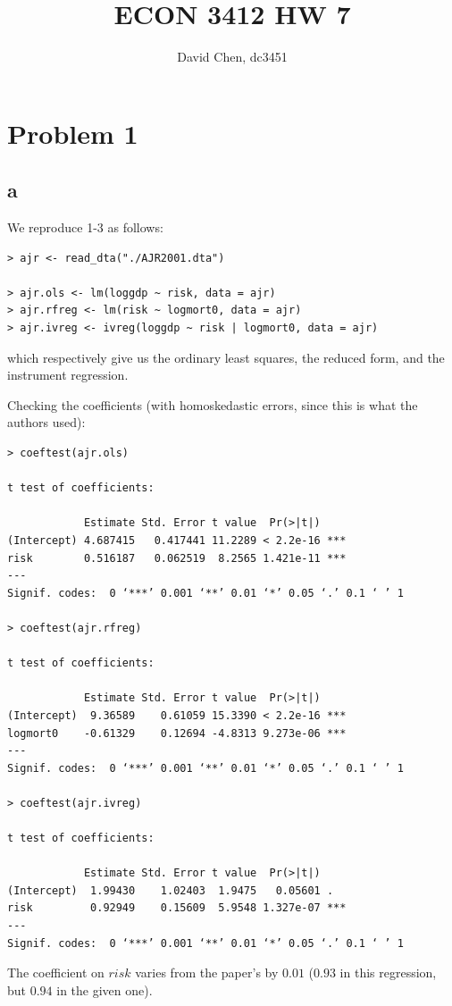 \documentclass[12pt,letterpaper]{article}
\title{ECON 3412 HW 7}
\author{David Chen, dc3451}
\theoremstyle{definition}
\begin{document}
\maketitle

\section*{Problem 1}
\subsection*{a}

We reproduce 1-3 as follows:
\begin{Verbatim}[fontsize=\small]
> ajr <- read_dta("./AJR2001.dta")

> ajr.ols <- lm(loggdp ~ risk, data = ajr)
> ajr.rfreg <- lm(risk ~ logmort0, data = ajr)
> ajr.ivreg <- ivreg(loggdp ~ risk | logmort0, data = ajr)
\end{Verbatim}
which respectively give us the ordinary least squares, the reduced form, and the instrument regression.

Checking the coefficients (with homoskedastic errors, since this is what the authors used):
\begin{Verbatim}[fontsize=\small]
> coeftest(ajr.ols)

t test of coefficients:

            Estimate Std. Error t value  Pr(>|t|)
(Intercept) 4.687415   0.417441 11.2289 < 2.2e-16 ***
risk        0.516187   0.062519  8.2565 1.421e-11 ***
---
Signif. codes:  0 ‘***’ 0.001 ‘**’ 0.01 ‘*’ 0.05 ‘.’ 0.1 ‘ ’ 1

> coeftest(ajr.rfreg)

t test of coefficients:

            Estimate Std. Error t value  Pr(>|t|)
(Intercept)  9.36589    0.61059 15.3390 < 2.2e-16 ***
logmort0    -0.61329    0.12694 -4.8313 9.273e-06 ***
---
Signif. codes:  0 ‘***’ 0.001 ‘**’ 0.01 ‘*’ 0.05 ‘.’ 0.1 ‘ ’ 1

> coeftest(ajr.ivreg)

t test of coefficients:

            Estimate Std. Error t value  Pr(>|t|)
(Intercept)  1.99430    1.02403  1.9475   0.05601 .
risk         0.92949    0.15609  5.9548 1.327e-07 ***
---
Signif. codes:  0 ‘***’ 0.001 ‘**’ 0.01 ‘*’ 0.05 ‘.’ 0.1 ‘ ’ 1
\end{Verbatim}

The coefficient on $risk$ varies from the paper's by $0.01$ ($0.93$ in this regression, but $0.94$ in the given one).
\end{document}

